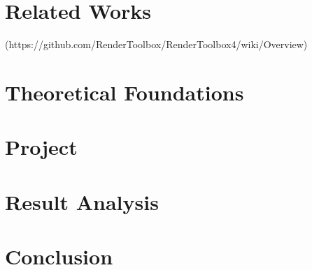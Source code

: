 \documentclass[cic,tc,english]{iiufrgs}
\begin{document}

\chapter{Related Works}


(https://github.com/RenderToolbox/RenderToolbox4/wiki/Overview)

\chapter{Theoretical Foundations}
\chapter{Project}
\chapter{Result Analysis}
\chapter{Conclusion}




\end{document}
